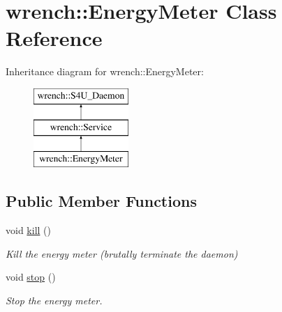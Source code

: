 \hypertarget{classwrench_1_1_energy_meter}{}\section{wrench\+:\+:Energy\+Meter Class Reference}
\label{classwrench_1_1_energy_meter}
Inheritance diagram for wrench\+:\+:Energy\+Meter\+:\begin{figure}[H]
\begin{center}
\leavevmode
\includegraphics[height=3.000000cm]{classwrench_1_1_energy_meter}
\end{center}
\end{figure}
\subsection*{Public Member Functions}
\begin{DoxyCompactItemize}
\item 
\mbox{\label{classwrench_1_1_energy_meter_a2f39104adc8875ae269dea7c58b5aa06}} 
void \hyperlink{classwrench_1_1_energy_meter_a2f39104adc8875ae269dea7c58b5aa06}{kill} ()
\begin{DoxyCompactList}\small\item\em Kill the energy meter (brutally terminate the daemon) \end{DoxyCompactList}\item 
void \hyperlink{classwrench_1_1_energy_meter_ab5191f00d7af7cff9cecb664d2e784d8}{stop} ()
\begin{DoxyCompactList}\small\item\em Stop the energy meter. \end{DoxyCompactList}\end{DoxyCompactItemize}
